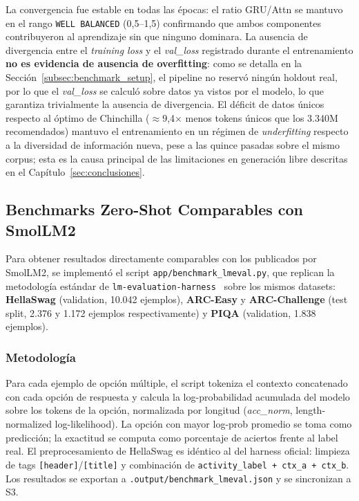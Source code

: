 La convergencia fue estable en todas las épocas: el ratio GRU/Attn se mantuvo en el rango \texttt{WELL BALANCED} (0,5--1,5) confirmando que ambos componentes contribuyeron al aprendizaje sin que ninguno dominara. La ausencia de divergencia entre el \textit{training loss} y el \textit{val\_loss} registrado durante el entrenamiento \textbf{no es evidencia de ausencia de overfitting}: como se detalla en la Sección~\ref{subsec:benchmark_setup}, el pipeline no reservó ningún holdout real, por lo que el \textit{val\_loss} se calculó sobre datos ya vistos por el modelo, lo que garantiza trivialmente la ausencia de divergencia. El déficit de datos únicos respecto al óptimo de Chinchilla ($\approx$9,4$\times$ menos tokens únicos que los 3.340M recomendados) mantuvo el entrenamiento en un régimen de \textit{underfitting} respecto a la diversidad de información nueva, pese a las quince pasadas sobre el mismo corpus; esta es la causa principal de las limitaciones en generación libre descritas en el Capítulo~\ref{sec:conclusiones}.

\subsection{Benchmarks Zero-Shot Comparables con SmolLM2}
\label{subsec:lmeval}

Para obtener resultados directamente comparables con los publicados por SmolLM2, se implementó el script \texttt{app/benchmark\_lmeval.py}, que replican la metodología estándar de \texttt{lm-evaluation-harness}~\cite{eval-harness} sobre los mismos datasets: \textbf{HellaSwag} (validation, 10.042 ejemplos), \textbf{ARC-Easy} y \textbf{ARC-Challenge} (test split, 2.376 y 1.172 ejemplos respectivamente) y \textbf{PIQA} (validation, 1.838 ejemplos).

\subsubsection*{Metodología}

Para cada ejemplo de opción múltiple, el script tokeniza el contexto concatenado con cada opción de respuesta y calcula la log-probabilidad acumulada del modelo sobre los tokens de la opción, normalizada por longitud (\textit{acc\_norm}, length-normalized log-likelihood). La opción con mayor log-prob promedio se toma como predicción; la exactitud se computa como porcentaje de aciertos frente al label real. El preprocesamiento de HellaSwag es idéntico al del harness oficial: limpieza de tags \texttt{[header]}/\texttt{[title]} y combinación de \texttt{activity\_label + ctx\_a + ctx\_b}. Los resultados se exportan a \texttt{.output/benchmark\_lmeval.json} y se sincronizan a S3.

